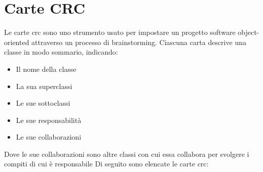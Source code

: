\section{Carte CRC}
Le carte \gls{crc} sono uno strumento usato per impostare un progetto software object-oriented attraverso un processo di brainstorming.
Ciascuna carta descrive una classe in modo sommario, indicando:
\begin{itemize}
	\item Il nome della classe
 	\item La sua superclassi
 	\item Le sue sottoclassi
 	\item Le sue responsabilità
 	\item Le sue collaborazioni
\end{itemize}
Dove le sue collaborazioni sono altre classi con cui essa collabora per svolgere i compiti di cui è responsabile
Di seguito sono elencate le carte \gls{crc}:
